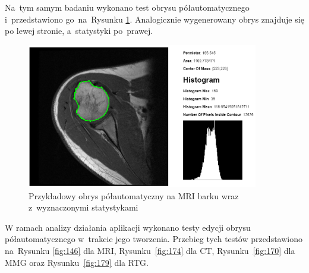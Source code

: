 \documentclass[a4paper,11pt,twoside,openright]{report}
\theoremstyle{definition}
\begin{document}
Na~tym samym badaniu wykonano test obrysu półautomatycznego i~przedstawiono
go~na~Rysunku \ref{fig:107}. Analogicznie wygenerowany obrys znajduje się po lewej stronie,
a~statystyki po~prawej.

\begin{figure}[h!]
	\center
	\includegraphics[width=0.9\textwidth]{107}
	\caption{Przykładowy obrys półautomatyczny na MRI barku
	wraz z~wyznaczonymi statystykami}
    	\label{fig:107}
\end{figure}

\pagebreak

W ramach analizy działania aplikacji wykonano testy edycji obrysu półautomatycznego w~trakcie
jego tworzenia. Przebieg tych testów przedstawiono na~Rysunku \ref{fig:146} dla MRI,
Rysunku~\ref{fig:174} dla CT, Rysunku~\ref{fig:170} dla MMG oraz Rysunku~\ref{fig:179} dla RTG.
\end{document}

